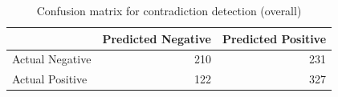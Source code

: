 \begin{table}
\caption{Confusion matrix for contradiction detection (overall)}
\label{tab:confusion_matrix}
\begin{tabular}{lrr}
\toprule
 & Predicted Negative & Predicted Positive \\
\midrule
Actual Negative & 210 & 231 \\
Actual Positive & 122 & 327 \\
\bottomrule
\end{tabular}
\end{table}
